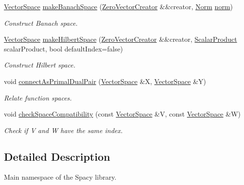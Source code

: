 \begin{DoxyCompactItemize}
\item 
\hyperlink{classSpacy_1_1VectorSpace}{Vector\+Space} \hyperlink{namespaceSpacy_a0b66c8f2345b693504180dc7fb187958}{make\+Banach\+Space} (\hyperlink{classSpacy_1_1ZeroVectorCreator}{Zero\+Vector\+Creator} \&\&creator, \hyperlink{namespaceSpacy_a0dbe77a4e1282ef88017e94d50d17791}{Norm} \hyperlink{namespaceSpacy_a86a4fc266aa19a07b0af16388907354b}{norm})\hypertarget{namespaceSpacy_a0b66c8f2345b693504180dc7fb187958}{}\label{namespaceSpacy_a0b66c8f2345b693504180dc7fb187958}

\begin{DoxyCompactList}\small\item\em Construct Banach space. \end{DoxyCompactList}\item 
\hyperlink{classSpacy_1_1VectorSpace}{Vector\+Space} \hyperlink{namespaceSpacy_a927756dd42df3e79c302df1f8f635b65}{make\+Hilbert\+Space} (\hyperlink{classSpacy_1_1ZeroVectorCreator}{Zero\+Vector\+Creator} \&\&creator, \hyperlink{namespaceSpacy_aa995526aa0e3fa58aca8dd6772311cad}{Scalar\+Product} scalar\+Product, bool default\+Index=false)\hypertarget{namespaceSpacy_a927756dd42df3e79c302df1f8f635b65}{}\label{namespaceSpacy_a927756dd42df3e79c302df1f8f635b65}

\begin{DoxyCompactList}\small\item\em Construct Hilbert space. \end{DoxyCompactList}\item 
void \hyperlink{namespaceSpacy_a72844d3d381380c382cd9dce912e2664}{connect\+As\+Primal\+Dual\+Pair} (\hyperlink{classSpacy_1_1VectorSpace}{Vector\+Space} \&X, \hyperlink{classSpacy_1_1VectorSpace}{Vector\+Space} \&Y)
\begin{DoxyCompactList}\small\item\em Relate function spaces. \end{DoxyCompactList}\item 
void \hyperlink{namespaceSpacy_aae18423491adef608743902f1c40844e}{check\+Space\+Compatibility} (const \hyperlink{classSpacy_1_1VectorSpace}{Vector\+Space} \&V, const \hyperlink{classSpacy_1_1VectorSpace}{Vector\+Space} \&W)
\begin{DoxyCompactList}\small\item\em Check if V and W have the same index. \end{DoxyCompactList}\end{DoxyCompactItemize}


\subsection{Detailed Description}
Main namespace of the Spacy library. 


